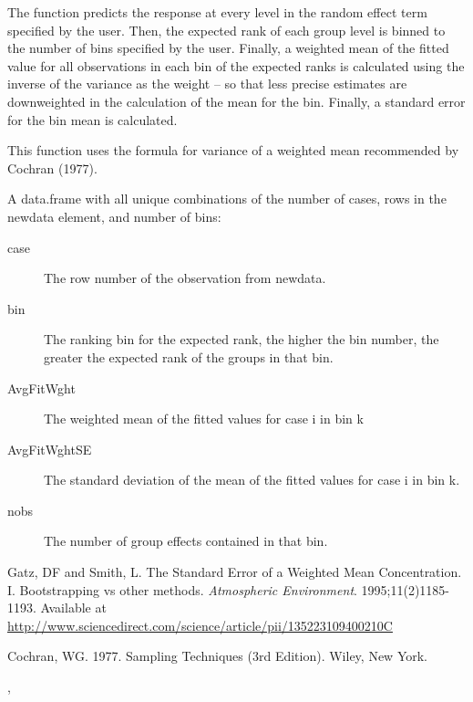 \documentclass[letterpaper]{book}
\begin{document}
%
\begin{Details}\relax
The function predicts the response at every level in the random effect term
specified by the user. Then, the expected rank of each group level is binned
to the number of bins specified by the user. Finally, a weighted mean of the
fitted value for all observations in each bin of the expected ranks is
calculated using the inverse of the variance as the weight -- so that less
precise estimates are downweighted in the calculation of the mean for the bin.
Finally, a standard error for the bin mean is calculated.

This function uses the formula for variance of a weighted mean
recommended by Cochran (1977).
\end{Details}
%
\begin{Value}
A data.frame with all unique combinations of the number of cases, rows
in the newdata element, and number of bins:
\begin{description}

\item[case] The row number of the observation from newdata.
\item[bin] The ranking bin for the expected rank, the higher the bin number,
the greater the expected rank of the groups in that bin.
\item[AvgFitWght] The weighted mean of the fitted values for case i in bin k
\item[AvgFitWghtSE] The standard deviation of the mean of the fitted values
for case i in bin k.
\item[nobs] The number of group effects contained in that bin.

\end{description}

\end{Value}
%
\begin{References}\relax
Gatz, DF and Smith, L. The Standard Error of a Weighted Mean Concentration.
I. Bootstrapping vs other methods. \emph{Atmospheric Environment}.
1995;11(2)1185-1193. Available at
\url{http://www.sciencedirect.com/science/article/pii/135223109400210C}

Cochran, WG. 1977. Sampling Techniques (3rd Edition). Wiley, New York.
\end{References}
%
\begin{SeeAlso}\relax
{}, 
\end{SeeAlso}
%
\end{document}

